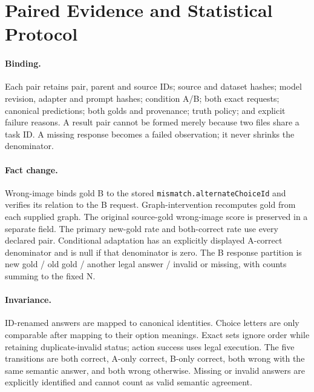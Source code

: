 \documentclass[10pt,letterpaper]{article}
\begin{document}
\clearpage
\section{Paired Evidence and Statistical Protocol}
\begin{table}[h]
\centering\small
\caption{Planned visual pair inventory. These aggregate counts describe
coverage; Color and Part-type must be analyzed separately. The generated
columns summarize paired correctness and B accuracy. Access contrasts
also require paired accuracy differences and QA status.}

\end{table}
\begin{table}[h]
\centering\small
\caption{Planned graph pair inventory. Neighbors and deletion are
separate analyses even when a comparison covers both.}

\end{table}

\paragraph{Binding.}
Each pair retains pair, parent and source IDs; source and dataset
hashes; model revision, adapter and prompt hashes; condition A/B;
both exact requests; canonical predictions; both golds and provenance;
truth policy; and explicit failure reasons. A result pair cannot be
formed merely because two files share a task ID. A missing response
becomes a failed observation; it never shrinks the denominator.

\paragraph{Fact change.}
Wrong-image binds gold B to the stored
\texttt{mismatch.alternateChoiceId} and verifies its relation to the B
request. Graph-intervention recomputes gold from each supplied graph.
The original source-gold wrong-image score is preserved in a separate
field. The primary new-gold rate and both-correct rate use every
declared pair. Conditional adaptation has an explicitly displayed
A-correct denominator and is null if that denominator is zero.
The B response partition is new gold / old gold / another legal answer /
invalid or missing, with counts summing to the fixed N.

\paragraph{Invariance.}
ID-renamed answers are mapped to canonical identities. Choice letters
are only comparable after mapping to their option meanings. Exact sets
ignore order while retaining duplicate-invalid status; action success
uses legal execution. The five transitions are both correct, A-only
correct, B-only correct, both wrong with the same semantic answer, and
both wrong otherwise. Missing or invalid answers are explicitly
identified and cannot count as valid semantic agreement.
\end{document}
